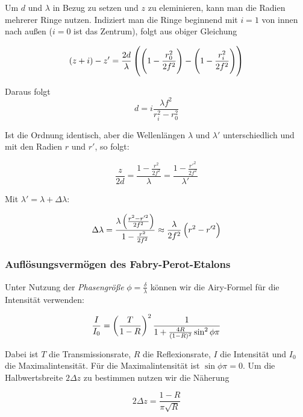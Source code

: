 \documentclass[a4paper,german,12pt,smallheadings]{scrartcl}
\begin{document}
Um $d$ und $\lambda$ in Bezug zu setzen und $z$ zu eleminieren, kann man die
Radien mehrerer Ringe nutzen. Indiziert man die Ringe beginnend mit $i = 1$ von
innen nach außen ($i = 0$ ist das Zentrum), folgt aus obiger Gleichung

\begin{equation}
  (z+i) - z' = \frac{2d}{\lambda} \del{\del{1-\frac{r_0^2}{2f^2}} - \del{1-\frac{r_i^2}{2f^2}}}
\end{equation}

Daraus folgt
\begin{equation}
  d = i \frac{\lambda f^2}{r_i^2 - r_0^2}
  \label{eq:deq}
\end{equation}

Ist die Ordnung identisch, aber die Wellenlängen $\lambda$ und $\lambda'$
unterschiedlich und mit den Radien $r$ und $r'$, so folgt:

\begin{equation}
  \frac{z}{2d} = \frac{1 - \frac{r^2}{2f^2}}{\lambda} = \frac{1 - \frac{r'^2}{2f^2}}{\lambda'}
\end{equation}

Mit $\lambda' = \lambda + \Delta \lambda$:

\begin{equation}
  \Delta \lambda = \frac{\lambda \del{\frac{r^2 - r'^2}{2f^2}}}{1 - \frac{r^2}{2f^2}} \approx \frac{\lambda}{2f^2} \del{r^2 - r'^2}
  \label{eq:linewidth}
\end{equation}

\subsubsection{Auflösungsvermögen des Fabry-Perot-Etalons}

Unter Nutzung der \textit{Phasengröße} $\phi = \frac{\delta}{\lambda}$ können
wir die Airy-Formel für die Intensität verwenden:

\begin{equation}
  \frac{I}{I_0} = \del{\frac{T}{1-R}}^2 \frac{1}{1+\frac{4R}{(1-R)^2} \sin^2 \phi \pi}
\end{equation}

Dabei ist $T$ die Transmissionsrate, $R$ die Reflexionsrate, $I$ die Intensität
und $I_0$ die Maximalintensität. Für die Maximalintensität ist $\sin \phi \pi =
0$. Um die Halbwertsbreite $2 \Delta z$ zu bestimmen nutzen wir die Näherung

\begin{equation}
  2 \Delta z = \frac{1-R}{\pi \sqrt{R}}
\end{equation}
\end{document}
